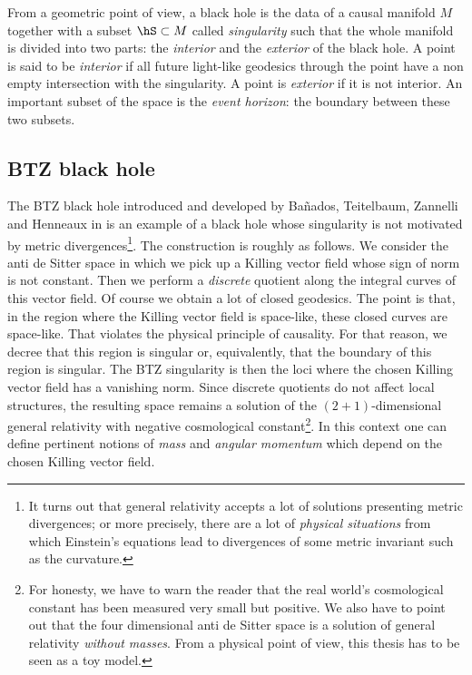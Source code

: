 From a geometric point of view, a black hole is the data of a causal manifold $M$ together with a subset $\hS \subset M$ called \emph{singularity} such that the whole manifold is divided into two parts: the \emph{interior} and the \emph{exterior} of the black hole. A point is said to be \emph{interior} if all future light-like geodesics through the point have a non empty intersection with the singularity. A point is \emph{exterior} if it is not interior. An important subset of the space is the \emph{event horizon}: the boundary between these two subsets.

\subsection{BTZ black hole}		

The BTZ black hole introduced and developed by Bañados, Teitelbaum, Zannelli and Henneaux in \cite{BTZ_un,BTZ_deux} is an example of a black hole whose singularity is not motivated by metric divergences\footnote{It turns out that general relativity accepts a lot of solutions presenting metric divergences; or more precisely, there are a lot of \emph{physical situations} from which Einstein's equations lead to divergences of some metric invariant such as the curvature.}. The construction is roughly as follows. We consider the anti de Sitter space in which we pick up a Killing vector field whose sign of norm is not constant. Then we perform a \emph{discrete} quotient along the integral curves of this vector field. Of course we obtain a lot of closed geodesics. The point is that, in the region where the Killing vector field is space-like, these closed curves are space-like. That violates the physical principle of causality. For that reason, we decree that this region is singular or, equivalently, that the boundary of this region is singular. The BTZ singularity is then the loci where the chosen Killing vector field has a vanishing norm. Since discrete quotients do not affect local structures, the resulting space remains a solution of the $(2+1)$-dimensional general relativity with negative cosmological constant\footnote{For honesty, we have to warn the reader that the real world's cosmological constant has been measured very small but positive. We also have to point out that the four dimensional anti de Sitter space is a solution of general relativity \emph{without masses}. From a physical point of view, this thesis has to be seen as a toy model.}. In this context one can define pertinent notions of  \emph{mass} and \emph{angular momentum} which depend on the chosen Killing vector field.

